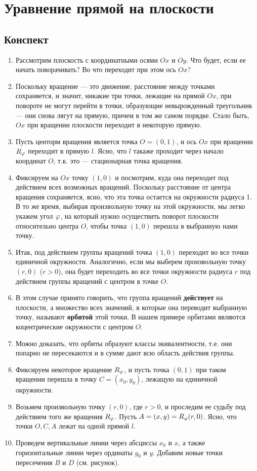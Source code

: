\section{Уравнение прямой на плоскости}

\subsection*{Конспект}

\begin{enumerate}
\item Рассмотрим плоскость с координатными осями $Ox$ и $Oy$. Что будет, если ее начать поворачивать? Во что переходит при этом ось $Ox$?
\item Поскольку вращение --- это движение, расстояние между точками сохраняется, и значит, никакие три точки, лежащие на прямой $Ox$, при повороте не могут перейти в точки, образующие невырожденный треугольник --- они снова лягут на прямую, причем в том же самом порядке. Стало быть, $Ox$ при вращении плоскости переходит в некоторую прямую.
\item Пусть центорм вращения является точка $O=(0,1)$, и ось $Ox$ при вращении $R_\varphi$ переходит в прямую $l$. Ясно, что $l$ такаже проходит через начало координат $O$, т.к. это --- стационарная точка вращения.
\item Фиксируем на $Ox$ точку $(1,0)$ и посмотрим, куда она переходит под действием всех возможных вращений. Поскольку расстояние от центра вращения сохраняется, ясно, что эта точка остается на окружности радиуса 1. В то же время, выбирая произвольную точку на этой окружности, мы легко укажем угол $\varphi$, на который нужно осуществить поворот плоскости относительно центра $O$, чтобы точка $(1,0)$ перешла в выбранную нами точку.
\item Итак, под действием группы вращений точка $(1,0)$ переходит во все точки единичной окружности. Аналогично, если мы выберем произвольную точку $(r,0)$ ($r>0$), она будет переходить во все точки окружности радиуса $r$ под действием группы вращений с центром в точке $O$.
\item В этом случае принято говорить, что группа вращений \textbf{действует} на плоскости, а множество всех значений, в которые она переводит выбранную точку, называют \textbf{орбитой} этой точки. В нашем примере орбитами являются коцентрические окружности с центром $O$.
\item Можно доказать, что орбиты образуют классы экивалентности, т.е. они попарно не пересекаются и в сумме дают всю область действия группы.
\item Фиксируем некоторое вращение $R_\varphi$, и пусть точка $(0,1)$ при таком вращении перешла в точку $C=(x_0,y_0)$, лежащую на единичной окружности.
\item Возьмем произвольную точку $(r,0)$, где $r>0$, и проследим ее судьбу под действием того же вращения $R_\varphi$. Пусть $A=(x,y)=R_\varphi(r,0)$. Ясно, что точки $O,C,A$ лежат на одной прямой $l$.
\item Проведем вертикальные линии через абсциссы $x_0$ и $x$, а также горизонтальные линии через ординаты $y_0$ и $y$. Добавим новые точки пересечения $B$ и $D$ (см. рисунок).


\end{enumerate}
